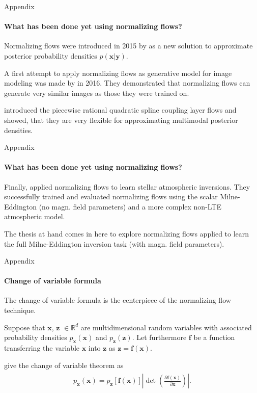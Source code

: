 \documentclass{beamer}
\newcommand\vect[1]{\ensuremath{\bm{#1}}}
\begin{document}
\begin{frame}[allowframebreaks]{Appendix}
	\framesubtitle{What has been done yet using normalizing flows?}
	Normalizing flows were introduced in 2015 by \cite{Rezende.21.05.2015} as a new solution to approximate posterior probability densities $p(\vect{x}|\vect{y})$.
	
	A first attempt to apply normalizing flows as generative model for image modeling was made by \cite{Dinh.27.05.2016} in 2016. They demonstrated that normalizing flows can generate very similar images as those they were trained on.
	
	\cite{Durkan.10.06.2019} introduced the piecewise rational quadratic spline coupling layer flows and showed, that they are very flexible for approximating multimodal posterior densities.
\end{frame}


\begin{frame}[allowframebreaks]{Appendix}
	\framesubtitle{What has been done yet using normalizing flows?}
	Finally, \cite{DiazBaso.2022} applied normalizing flows to learn stellar atmospheric inversions. They successfully trained and evaluated normalizing flows using the scalar Milne-Eddington (no magn. field parameters) and a more complex non-LTE atmospheric model.
	
	The thesis at hand comes in here to explore normalizing flows applied to learn the full Milne-Eddington inversion task (with magn. field parameters).
\end{frame}

\begin{frame}[allowframebreaks]{Appendix}
	\framesubtitle{Change of variable formula}
	The change of variable formula is the centerpiece of the normalizing flow technique. 
	
	Suppose that $\vect{x}$, $\vect{z}$ $\in \mathbb{R}^d$ are multidimensional random variables with associated probability densities $p_{\vect{x}}(\vect{x})$ and $p_{\vect{z}}(\vect{z})$. Let furthermore $\vect{f}$ be a function transferring the variable $\vect{x}$ into $\vect{z}$ as $\vect{z} = \vect{f}(\vect{x})$.
	
	\cite[p.196]{Deisenroth.2020} give the change of variable theorem as \begin{align}\begin{aligned}
			p_{\vect{x}}(\vect{x}) = p_{\vect{z}}[\vect{f}(\vect{x})]\left|\det\left(\frac{\partial \vect{f}(\vect{x})}{\partial \vect{x}}\right)\right|.
	\end{aligned}\end{align}
\end{frame}
\end{document}
